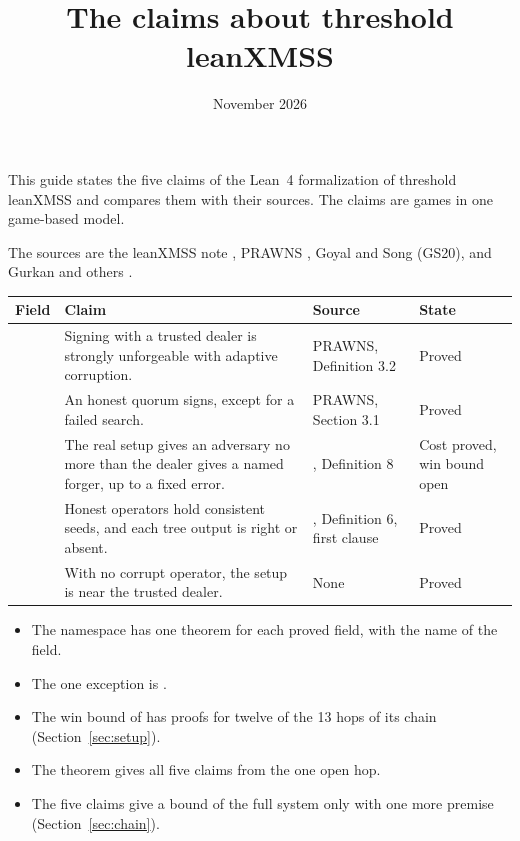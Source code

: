\documentclass[11pt]{article}
\title{The claims about threshold leanXMSS}
\author{}
\date{November 2026}
\newcommand{\rowrule}{\specialrule{0.2pt}{2.5pt}{2.5pt}}
\begin{document}
\maketitle

\noindent This guide states the five claims of the Lean~4 formalization of threshold leanXMSS and
compares them with their sources. The claims are games in one game-based model.

The sources are the leanXMSS note \cite{Wam26}, PRAWNS \cite{BBD+26}, Goyal and Song \cite{GS20}
(GS20), and Gurkan and others \cite{GJM+21}.
\begin{center}\small
\begin{tabularx}{\textwidth}{@{}L{3.5cm}XL{2.9cm}L{2.3cm}@{}}
\toprule
Field & Claim & Source & State \\
\midrule
{} & Signing with a trusted dealer is strongly unforgeable with adaptive
corruption. & PRAWNS, Definition 3.2 & Proved \\
\rowrule
{} & An honest quorum signs, except for a failed search. & PRAWNS,
Section 3.1 & Proved \\
\rowrule
{} & The real setup gives an adversary no more than the dealer gives a named
forger, up to a fixed error. & \cite{GJM+21}, Definition 8 & Cost proved, win bound open \\
\rowrule
{} & Honest operators hold consistent seeds, and each tree output is right or
absent. & \cite{GJM+21}, Definition 6, first clause & Proved \\
\rowrule
{} & With no corrupt operator, the setup is near the trusted dealer. & None &
Proved \\
\bottomrule
\end{tabularx}
\end{center}
\begin{itemize}
\item The namespace  has one theorem for each proved field, with
the name of the field.
\item The one exception is .
\item The win bound of  has proofs for twelve of the 13 hops of its chain
(Section~\ref{sec:setup}).
\item The theorem  gives all five claims from the one open hop.
\item The five claims give a bound of the full system only with one more premise
(Section~\ref{sec:chain}).
\end{itemize}
\end{document}
